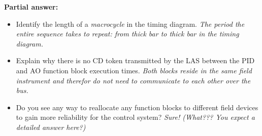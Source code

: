 





\noindent
{\bf Partial answer:}

\begin{itemize}
\item{} Identify the length of a {\it macrocycle} in the timing diagram.  {\it The period the entire sequence takes to repeat: from thick bar to thick bar in the timing diagram.}
\vskip 5pt
\item{} Explain why there is no CD token transmitted by the LAS between the PID and AO function block execution times.  {\it Both blocks reside in the same field instrument and therefor do not need to communicate to each other over the bus.}
\vskip 5pt
\item{} Do you see any way to reallocate any function blocks to different field devices to gain more reliability for the control system?  {\it Sure!  (What??? You expect a detailed answer here?)}
\end{itemize}







